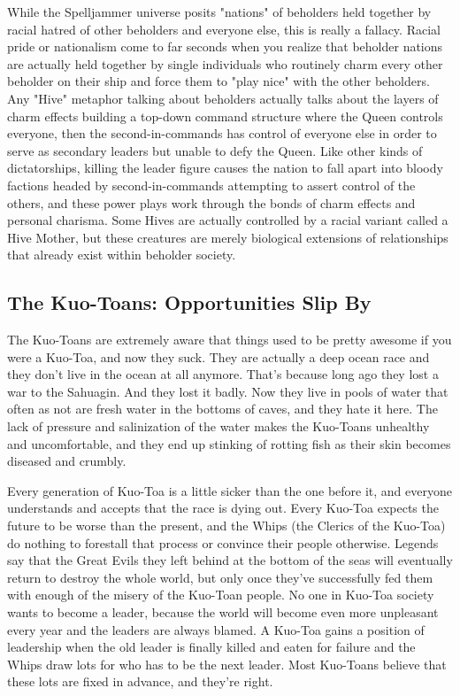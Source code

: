 While the Spelljammer universe posits "nations" of beholders held together by racial hatred of other beholders and everyone else, this is really a fallacy. Racial pride or nationalism come to far seconds when you realize that beholder nations are actually held together by single individuals who routinely charm every other beholder on their ship and force them to "play nice" with the other beholders. Any "Hive" metaphor talking about beholders actually talks about the layers of charm effects building a top-down command structure where the Queen controls everyone, then the second-in-commands has control of everyone else in order to serve as secondary leaders but unable to defy the Queen. Like other kinds of dictatorships, killing the leader figure causes the nation to fall apart into bloody factions headed by second-in-commands attempting to assert control of the others, and these power plays work through the bonds of charm effects and personal charisma. Some Hives are actually controlled by a racial variant called a Hive Mother, but these creatures are merely biological extensions of relationships that already exist within beholder society.

\subsection{The Kuo-Toans: Opportunities Slip By}

The Kuo-Toans are extremely aware that things used to be pretty awesome if you were a Kuo-Toa, and now they suck. They are actually a deep ocean race and they don't live in the ocean at all anymore. That's because long ago they lost a war to the Sahuagin. And they lost it badly. Now they live in pools of water that often as not are fresh water in the bottoms of caves, and they hate it here. The lack of pressure and salinization of the water makes the Kuo-Toans unhealthy and uncomfortable, and they end up stinking of rotting fish as their skin becomes diseased and crumbly.

Every generation of Kuo-Toa is a little sicker than the one before it, and everyone understands and accepts that the race is dying out. Every Kuo-Toa expects the future to be worse than the present, and the Whips (the Clerics of the Kuo-Toa) do nothing to forestall that process or convince their people otherwise. Legends say that the Great Evils they left behind at the bottom of the seas will eventually return to destroy the whole world, but only once they've successfully fed them with enough of the misery of the Kuo-Toan people. No one in Kuo-Toa society wants to become a leader, because the world will become even more unpleasant every year and the leaders are always blamed. A Kuo-Toa gains a position of leadership when the old leader is finally killed and eaten for failure and the Whips draw lots for who has to be the next leader. Most Kuo-Toans believe that these lots are fixed in advance, and they're right.

